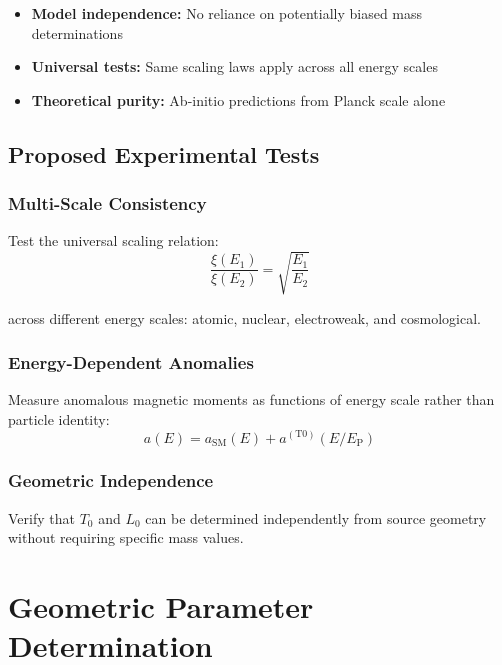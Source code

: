\documentclass[12pt,a4paper]{article}
\newcommand{\Tzero}{T_0}
\newcommand{\EP}{E_{\text{P}}}
\newcommand{\xipar}{\xi}
\begin{document}
	\begin{itemize}
		\item \textbf{Model independence:} No reliance on potentially biased mass determinations
		\item \textbf{Universal tests:} Same scaling laws apply across all energy scales
		\item \textbf{Theoretical purity:} Ab-initio predictions from Planck scale alone
	\end{itemize}
	
	\subsection{Proposed Experimental Tests}
	\label{subsec:experimental_tests}
	
	\subsubsection{Multi-Scale Consistency}
	
	Test the universal scaling relation:
	\begin{equation}
		\frac{\xipar(E_1)}{\xipar(E_2)} = \sqrt{\frac{E_1}{E_2}}
		\label{eq:scaling_test}
	\end{equation}
	
	across different energy scales: atomic, nuclear, electroweak, and cosmological.
	
	\subsubsection{Energy-Dependent Anomalies}
	
	Measure anomalous magnetic moments as functions of energy scale rather than particle identity:
	\begin{equation}
		a(E) = a_{\text{SM}}(E) + a^{(\text{T0})}(E/\EP)
		\label{eq:energy_dependent_anomaly}
	\end{equation}
	
	\subsubsection{Geometric Independence}
	
	Verify that $\Tzero$ and $L_0$ can be determined independently from source geometry without requiring specific mass values.
	
	\section{Geometric Parameter Determination}
	\label{sec:geometric_parameters}
	
\end{document}
